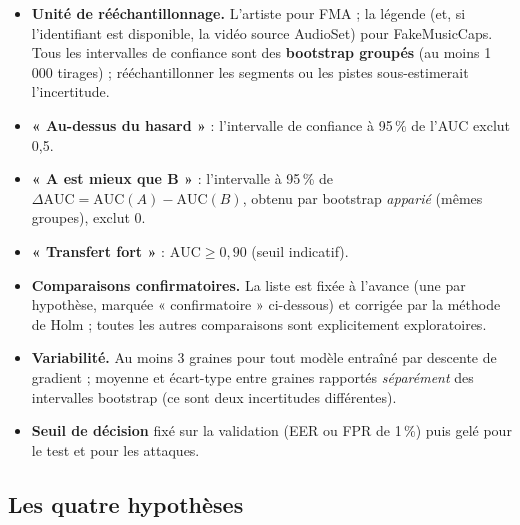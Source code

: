\documentclass[11pt,a4paper]{article}
\newcommand{\AUC}{\textrm{AUC}}
\begin{document}
\begin{itemize}
  \item \textbf{Unité de rééchantillonnage.} L'artiste pour FMA ; la légende (et, si l'identifiant est disponible, la vidéo source AudioSet) pour FakeMusicCaps. Tous les intervalles de confiance sont des \textbf{bootstrap groupés} (au moins 1\,000 tirages) ; rééchantillonner les segments ou les pistes sous-estimerait l'incertitude.
  \item \textbf{« Au-dessus du hasard »} : l'intervalle de confiance à 95\,\% de l'AUC exclut 0,5.
  \item \textbf{« A est mieux que B »} : l'intervalle à 95\,\% de $\Delta\AUC = \AUC(A)-\AUC(B)$, obtenu par bootstrap \emph{apparié} (mêmes groupes), exclut 0.
  \item \textbf{« Transfert fort »} : $\AUC \geq 0{,}90$ (seuil indicatif).
  \item \textbf{Comparaisons confirmatoires.} La liste est fixée à l'avance (une par hypothèse, marquée « confirmatoire » ci-dessous) et corrigée par la méthode de Holm ; toutes les autres comparaisons sont explicitement exploratoires.
  \item \textbf{Variabilité.} Au moins 3 graines pour tout modèle entraîné par descente de gradient ; moyenne et écart-type entre graines rapportés \emph{séparément} des intervalles bootstrap (ce sont deux incertitudes différentes).
  \item \textbf{Seuil de décision} fixé sur la validation (EER ou FPR de 1\,\%) puis gelé pour le test et pour les attaques.
\end{itemize}

\subsection{Les quatre hypothèses}
\end{document}
